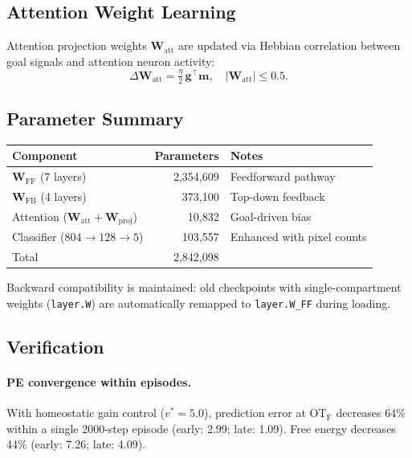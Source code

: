 \documentclass[11pt,a4paper]{article}
\begin{document}
\subsection{Attention Weight Learning}

Attention projection weights $\mathbf{W}_\text{att}$ are updated via
Hebbian correlation between goal signals and attention neuron activity:
\begin{equation}\label{eq:att_learn}
  \Delta\mathbf{W}_\text{att} = \tfrac{\eta}{2}\,
    \mathbf{g}^\top \mathbf{m},
  \quad |\mathbf{W}_\text{att}| \leq 0.5.
\end{equation}

\subsection{Parameter Summary}

\begin{center}
\begin{tabular}{lrl}
\toprule
Component & Parameters & Notes \\
\midrule
$\mathbf{W}_\text{FF}$ (7 layers) & 2,354,609 & Feedforward pathway \\
$\mathbf{W}_\text{FB}$ (4 layers) & 373,100 & Top-down feedback \\
Attention ($\mathbf{W}_\text{att} + \mathbf{W}_\text{proj}$) & 10,832 & Goal-driven bias \\
Classifier ($804{\to}128{\to}5$) & 103,557 & Enhanced with pixel counts \\
\midrule
Total & 2,842,098 & \\
\bottomrule
\end{tabular}
\end{center}

Backward compatibility is maintained: old checkpoints with single-compartment
weights (\texttt{layer.W}) are automatically remapped to
\texttt{layer.W\_FF} during loading.

\subsection{Verification}\label{sec:pc_verification}

\paragraph{PE convergence within episodes.}
With homeostatic gain control ($v^* = 5.0$), prediction error at OT$_\text{F}$
decreases 64\% within a single 2000-step episode
(early: 2.99; late: 1.09).
Free energy decreases 44\% (early: 7.26; late: 4.09).
\end{document}
